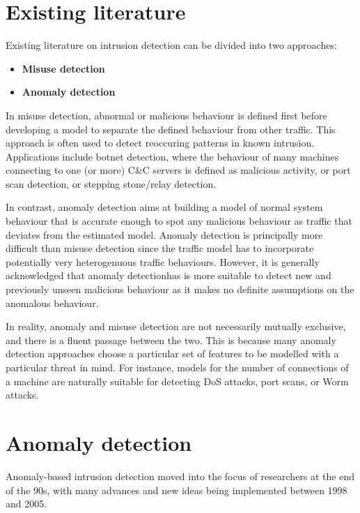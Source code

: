 \documentclass[a4paper,12pt,twoside]{report}
\begin{document}
\chapter{Existing literature}

Existing literature on intrusion detection can be divided into two approaches: 

\begin{itemize}
\item \textbf{Misuse detection}
\item \textbf{Anomaly detection}
\end{itemize} 

In misuse detection, abnormal or malicious behaviour is defined first before developing a model to separate the defined behaviour from other traffic. This approach is often used to detect reoccuring patterns in known intrusion. Applications include botnet detection, where the behaviour of many machines connecting to one (or more) C\&C servers is defined as malicious activity, or port scan detection, or stepping stone/relay detection.

In contrast, anomaly detection aims at building a model of normal system behaviour that is accurate enough to spot any malicious behaviour as traffic that deviates from the estimated model. Anomaly detection is principally more difficult than misuse detection since the traffic model has to incorporate potentially very heterogenuous traffic behaviours. However, it is generally acknowledged that anomaly detectionhas is more suitable to detect new and previously unseen malicious behaviour as it makes no definite assumptions on the anomalous behaviour. 
\linebreak

In reality, anomaly and misuse detection are not necessarily mutually exclusive, and there is a fluent passage between the two. This is because many anomaly detection approaches choose a particular set of features to be modelled with a particular threat in mind. For instance, models for the number of connections of a machine are naturally suitable for detecting DoS attacks, port scans, or Worm attacks. 

\chapter{Anomaly detection}

Anomaly-based intrusion detection moved into the focus of researchers at the end of the 90s, with many advances and new ideas being implemented between 1998 and 2005. 
\end{document}
